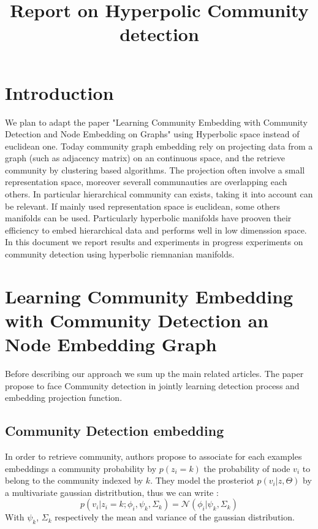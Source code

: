 \documentclass{article}
\title{Report on Hyperpolic Community detection}
\author{}
\begin{document}
    \maketitle
    \section{Introduction}

        We plan to adapt the paper "Learning Community Embedding with Community Detection and Node Embedding on Graphs"
        using Hyperbolic space instead of euclidean one.
        Today community graph embedding rely on projecting data from a graph (such as adjacency matrix) on an continuous 
        space, and the retrieve community by clustering based algorithms.
        The  projection often involve a small representation space, moreover severall communauties are overlapping each others.
        In particular hierarchical community can exists, taking it into account can be relevant.
        If mainly used representation space is euclidean, some others manifolds can be used.
        Particularly hyperbolic manifolds have prooven their efficiency to embed hierarchical data and performs well in low dimenssion space.
        In this document we report results and experiments in progress experiments on community detection using hyperbolic riemnanian manifolds.

    \section{Learning Community Embedding with Community Detection an Node Embedding Graph}
    Before describing our approach we sum up the main related articles.  The paper propose to face Community detection in jointly learning detection process and embedding projection function.

    \subsection{Community Detection embedding}
        In order to retrieve community, authors propose to associate for each examples embeddings a community probability by $p(z_i=k)$ the probability of node $v_i$ to belong to the community indexed by $k$. They model the prosteriot $p(v_i|z, \Theta)$ by a multivariate gaussian distritbution, thus we can write :
        $$
            p(v_i |z_i = k; \phi_i, \psi_k, \Sigma_k) = \mathcal{N}(\phi_i| \psi_k, \Sigma_k)
        $$
        With $\psi_k$, $\Sigma_k$ respectively the mean and variance of the gaussian distribution.
\end{document}
